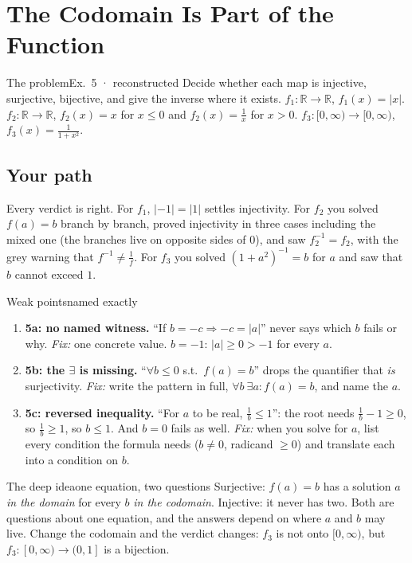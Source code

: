 \documentclass{kaelearn}
\begin{document}
\section{The Codomain Is Part of the Function}

\begin{panel}[unbreakable]{The problem}{Ex.\ 5 · reconstructed}{}
Decide whether each map is injective, surjective, bijective, and give the inverse where it exists.
$f_1:\mathbb{R}\to\mathbb{R}$, $f_1(x)=|x|$. \quad
$f_2:\mathbb{R}\to\mathbb{R}$, $f_2(x)=x$ for $x\le0$ and $f_2(x)=\frac1x$ for $x>0$. \quad
$f_3:[0,\infty)\to[0,\infty)$, $f_3(x)=\frac{1}{1+x^2}$.
\end{panel}

\subsection{Your path}
Every verdict is right. For $f_1$, $|-1|=|1|$ settles injectivity. For $f_2$ you solved $f(a)=b$ branch by branch,
proved injectivity in three cases including the mixed one (the branches live on opposite sides of $0$), and saw
$f_2^{-1}=f_2$, with the grey warning that $f^{-1}\neq\frac1f$. For $f_3$ you solved $(1+a^2)^{-1}=b$ for $a$ and saw
that $b$ cannot exceed $1$.

\begin{panel}[unbreakable]{Weak points}{named exactly}{}
\begin{enumerate}
  \item \textbf{5a: no named witness.} ``If $b=-c\Rightarrow-c=|a|$'' never says which $b$ fails or why.
        \emph{Fix:} one concrete value. $b=-1$: $|a|\ge0>-1$ for every $a$.
  \item \textbf{5b: the $\exists$ is missing.} ``$\forall b\le0$ s.t.\ $f(a)=b$'' drops the quantifier that
        \emph{is} surjectivity. \emph{Fix:} write the pattern in full, $\forall b\ \exists a: f(a)=b$, and name the $a$.
  \item \textbf{5c: reversed inequality.} ``For $a$ to be real, $\frac1b\le1$'': the root needs $\frac1b-1\ge0$, so
        $\frac1b\ge1$, so $b\le1$. And $b=0$ fails as well. \emph{Fix:} when you solve for $a$, list every condition
        the formula needs ($b\neq0$, radicand $\ge0$) and translate each into a condition on $b$.
\end{enumerate}
\end{panel}

\begin{panel}[unbreakable]{The deep idea}{one equation, two questions}{}
Surjective: $f(a)=b$ has a solution $a$ \emph{in the domain} for every $b$ \emph{in the codomain}. Injective: it never
has two. Both are questions about one equation, and the answers depend on where $a$ and $b$ may live. Change the
codomain and the verdict changes: $f_3$ is not onto $[0,\infty)$, but $f_3:[0,\infty)\to(0,1]$ is a bijection.
\end{panel}
\end{document}
